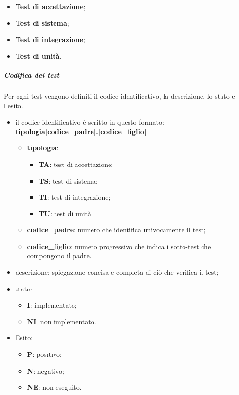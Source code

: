 \begin{itemize}
	\item \textbf{Test di accettazione};
	\item \textbf{Test di sistema};
	\item \textbf{Test di integrazione};
	\item \textbf{Test di unità}.
\end{itemize}
\subparagraph*{Codifica dei test}
Per ogni test vengono definiti il codice identificativo, la descrizione, lo stato e l'esito.
\begin{itemize}
	\item il codice identificativo è scritto in questo formato:\\
	\textbf{tipologia[codice\_padre].[codice\_figlio]}
	\begin{itemize}
		\item \textbf{tipologia}:
		\begin{itemize}
			\item \textbf{TA}: test di accettazione;
			\item \textbf{TS}: test di sistema;
			\item \textbf{TI}: test di integrazione;
			\item \textbf{TU}: test di unità.
		\end{itemize}
		\item \textbf{codice\_padre}: numero che identifica univocamente il test;
		\item \textbf{codice\_figlio}: numero progressivo che indica i sotto-test che compongono il padre. 
	\end{itemize}
	\item descrizione: spiegazione concisa e completa di ciò che verifica il test;
	\item stato:
	\begin{itemize}
		\item \textbf{I}: implementato;
		\item \textbf{NI}: non implementato.
	\end{itemize}
	\item Esito:
	\begin{itemize}
		\item \textbf{P}: positivo;
		\item \textbf{N}: negativo;
		\item \textbf{NE}: non eseguito.
	\end{itemize}
\end{itemize}

